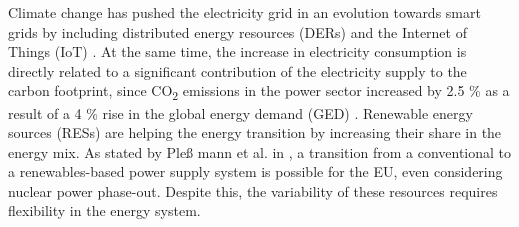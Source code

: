 Climate change has pushed the electricity grid in an evolution towards smart grids by including distributed energy resources (DERs) and the {Internet of Things (IoT)} \cite{EuropeanCommission2012}. At the same time, the increase in electricity consumption is directly related to a significant contribution of the electricity supply to the carbon footprint, since CO\textsubscript 2 emissions in the power sector increased by 2.5 \% as a result of a 4 \% rise  in the global energy demand (GED) \cite{IEA2018}. Renewable energy sources (RESs) are helping the energy transition by increasing their share in the energy mix. {As stated by Ple{\ss}%
mann et al. in \cite{PLEMANN201719}, a transition from a conventional to a renewables-based power supply system is possible for the EU, even considering nuclear power phase-out.} Despite this, the variability of these resources requires flexibility in the energy system.


